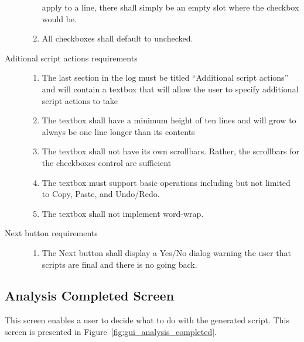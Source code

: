 \begin{description}
\begin{enumerate}
  apply to a line, there shall simply be an empty slot where the checkbox would
  be.
  \item All checkboxes shall default to unchecked.
\end{enumerate}
\item[Aditional script actions requirements] \hfill
\begin{enumerate}
  \item The last section in the log must be titled ``Additional script
  actions'' and will contain a textbox that will allow the user to specify
  additional script actions to take
  \item The textbox shall have a minimum height of ten lines and will
  grow to always be one line longer than its contents
  \item The textbox shall not have its own scrollbars.  Rather, the scrollbars
  for the checkboxes control are sufficient
  \item The textbox must support basic operations including but not limited
  to Copy, Paste, and Undo/Redo.
  \item The textbox shall not implement word-wrap.
\end{enumerate}
\item[Next button requirements] \hfill
\begin{enumerate}
  \item The Next button shall display a Yes/No dialog warning the user that
  scripts are final and there is no going back.
\end{enumerate}
\end{description}

\subsection{Analysis Completed Screen}
This screen enables a user to decide what to do with the generated script.  This
screen is presented in Figure~\ref{fig:gui_analysis_completed}.

